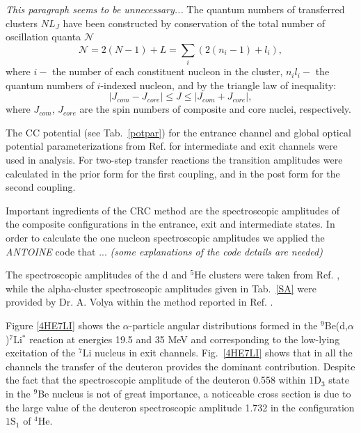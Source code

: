 \documentclass[10pt]{iopart}
\begin{document}
\textit{This paragraph seems to be unnecessary...} The quantum numbers of transferred clusters $NL_J$ have been constructed by conservation of the total number of oscillation quanta $\mathcal{N}$ \cite{satchler1983}
\begin{equation} \mathcal{N} =2(N-1)+L=\sum_{i} \left( 2 \left( n_i -1 \right) + l_i \right), \end{equation}
where $i -$ the number of each constituent nucleon in the cluster, $n_i l_i -$ the quantum numbers of $i$-indexed nucleon, and by the triangle law of inequality:
\begin{equation} \vert {J}_{com} - {J}_{core} \vert \le {J} \le \vert {J}_{com} + {J}_{core} \vert, \end{equation}
where $J_{com}$, $J_{core}$ are the spin numbers of composite and core nuclei, respectively.

The CC potential (see Tab.~\ref{potpar}) for the entrance channel and global optical potential parameterizations from Ref. \cite{globalTriton, globalAlpha, global6Li} for intermediate and exit channels were used in analysis. For two-step transfer reactions the transition amplitudes were calculated in the prior form for the first coupling, and in the post form for the second coupling.

Important ingredients of the CRC method are the spectroscopic amplitudes of the composite configurations in the entrance, exit and intermediate states. In order to calculate the one nucleon spectroscopic amplitudes we applied the \textit{ANTOINE} code \cite{antoine} that ... \textit{(some explanations of the code details are needed)}

The spectroscopic amplitudes of the d and ${}^5$He clusters were taken from Ref. \cite{fiveSA}, while the alpha-cluster spectroscopic amplitudes given in Tab.~\ref{SA} were provided by Dr. A. Volya within the method reported in Ref. \cite{volya2017}.

Figure \ref{4HE7LI} shows the $\alpha$-particle angular distributions formed in the ${}^9$Be(d,$\alpha$)${}^7$Li$^*$ reaction at energies 19.5 and 35 MeV and corresponding to the low-lying excitation of the ${}^7$Li nucleus in exit channels. Fig.~\ref{4HE7LI} shows that in all the channels the transfer of the deuteron provides the dominant contribution. Despite the fact that the spectroscopic amplitude of the deuteron 0.558 within ${1\textrm{D}_3}$ state \cite{bodek1989} in the ${}^9$Be nucleus is not of great importance, a noticeable cross section is due to the large value of the deuteron spectroscopic amplitude 1.732 in the configuration ${1\textrm{S}_1}$ of ${}^4$He.
\end{document}
